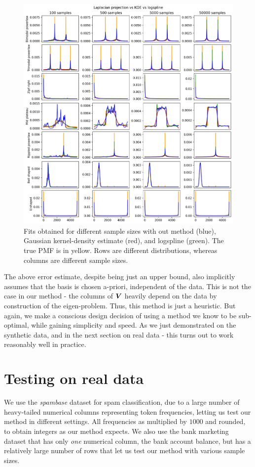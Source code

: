 \documentclass[10pt]{article} %
\begin{document}
\begin{figure}[tbh]
    \centering
    \includegraphics[width=\textwidth]{performance_synthetic_comparison.png}
    \caption{Fits obtained for different sample sizes with out method (blue), Gaussian kernel-density estimate (red), and logspline (green). The true PMF is in yellow. Rows are different distributions, whereas columns are different sample sizes.}
    \label{fig:performance_comparison_synthetic}
\end{figure}

The above error estimate, despite being just an upper bound, also implicitly assumes that the basis is chosen a-priori, independent of the data. This is not the case in our method - the columns of ${\bm{V}}$ heavily depend on the data by construction of the eigen-problem. Thus, this method is just a heuristic. But again,  we make a conscious design decision of using a method we know to be sub-optimal, while gaining simplicity and speed. As we just demonstrated on the synthetic data, and in the next section on real data - this turns out to work reasonably well in practice.

\section{Testing on real data}
We use the \emph{spambase} dataset \citep{spambase_94} for spam classification, due to a large number of heavy-tailed numerical columns representing token frequencies, letting us test our method in different settings. All frequencies as multiplied by $1000$ and rounded, to obtain integers as our method expects. We also use the bank marketing dataset \citep{bank_marketing_222} that has only \emph{one} numerical column, the bank account balance, but has a relatively large number of rows that let us test our method with various sample sizes.
\end{document}

